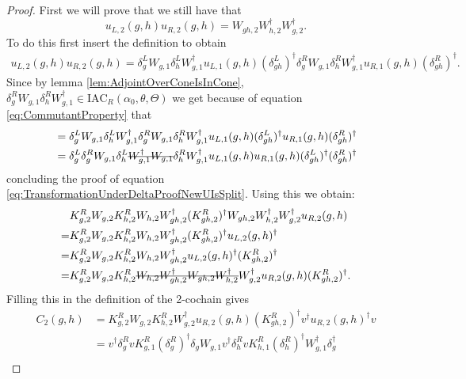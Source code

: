 \documentclass[12pt,a4paper,twoside]{article}
\newcommand{\stkout}[1]{\ifmmode\text{\sout{\ensuremath{#1}}}\else\sout{#1}\fi}
\newcommand{\IAC}{\textrm{IAC}}
\theoremstyle{definition}
\numberwithin{equation}{section}
\begin{document}
\begin{proof}
	First we will prove that we still have that
	\begin{equation}\label{eq:TransformationUnderDeltaProofNewUIsSplit}
		u_{L,2}(g,h)u_{R,2}(g,h)=W_{gh,2}W_{h,2}^\dagger W_{g,2}^\dagger.
	\end{equation}
	To do this first insert the definition to obtain
	\begin{align}
		u_{L,2}(g,h)u_{R,2}(g,h)=\delta_g^L W_{g,1}\delta_h^L W_{g,1}^\dagger u_{L,1}(g,h)(\delta_{gh}^L)^\dagger \delta_g^R W_{g,1}\delta_h^R W_{g,1}^\dagger u_{R,1}(g,h)(\delta_{gh}^R)^\dagger.
	\end{align}
	Since by lemma \ref{lem:AdjointOverConeIsInCone}, $\delta_g^R W_{g,1}\delta_h^R W_{g,1}^\dagger\in\IAC_R(\alpha_0,\theta,\Theta)$ we get because of equation \eqref{eq:CommutantProperty} that
	\begin{align}
		&=\delta_g^L W_{g,1}\delta_h^L W_{g,1}^\dagger \delta_g^R W_{g,1}\delta_h^R W_{g,1}^\dagger u_{L,1}(g,h)(\delta_{gh}^L)^\dagger  u_{R,1}(g,h)(\delta_{gh}^R)^\dagger\\
		&=\delta_g^L \delta_g^R W_{g,1}\delta_h^L \stkout{ W_{g,1}^\dagger W_{g,1}}\delta_h^R W_{g,1}^\dagger u_{L,1}(g,h)  u_{R,1}(g,h)(\delta_{gh}^L)^\dagger(\delta_{gh}^R)^\dagger
	\end{align}
	concluding the proof of equation \eqref{eq:TransformationUnderDeltaProofNewUIsSplit}. Using this we obtain:
	\begin{align}
		&K_{g,2}^RW_{g,2}K_{h,2}^{R}W_{h,2}W_{gh,2}^\dagger(K_{gh,2}^R)^\dagger W_{gh,2}W_{h,2}^\dagger W_{g,2}^\dagger u_{R,2}(g,h)\\
		=&K_{g,2}^RW_{g,2}K_{h,2}^{R}W_{h,2}W_{gh,2}^\dagger(K_{gh,2}^R)^\dagger u_{L,2}(g,h)^\dagger\\
		=&K_{g,2}^RW_{g,2}K_{h,2}^{R}W_{h,2}W_{gh,2}^\dagger u_{L,2}(g,h)^\dagger (K_{gh,2}^R)^\dagger\\
		=&K_{g,2}^RW_{g,2}K_{h,2}^{R}\stkout{W_{h,2}W_{gh,2}^\dagger W_{gh,2}W_{h,2}^\dagger} W_{g,2}^\dagger u_{R,2}(g,h) (K_{gh,2}^R)^\dagger.
	\end{align}
	Filling this in the definition of the 2-cochain gives
	\begin{align}
		C_2(g,h)&=K_{g,2}^RW_{g,2}K_{h,2}^{R}W_{g,2}^\dagger u_{R,2}(g,h) (K_{gh,2}^R)^\dagger v^\dagger u_{R,2}(g,h)^\dagger v\\
		&=v^\dagger \delta_g^R v K_{g,1}^R (\delta_g^R)^\dagger \delta_g W_{g,1}v^\dagger \delta_h^R v K_{h,1}^R (\delta_h^R)^\dagger W_{g,1}^\dagger \delta_g^\dagger\\

\end{align}
\end{proof}
\end{document}
